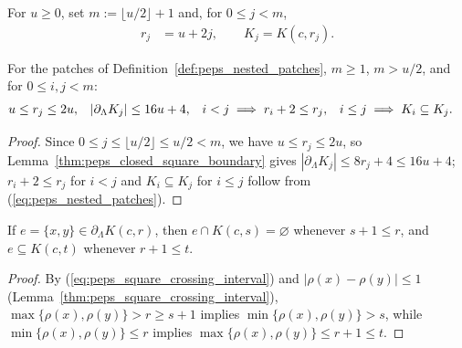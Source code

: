 \begin{definition}
    \label{def:peps_nested_patches}
    \leanok
    For $u\ge0$, set $m:=\lfloor u/2\rfloor+1$ and, for $0\le j<m$,
    \begin{align}
        r_j & =u+2j,\qquad K_j=K(c,r_j).
        \label{eq:peps_nested_patches}
    \end{align}
\end{definition}

\begin{lemma}
    \label{thm:peps_nested_patch_sizes}
    \leanok
    For the patches of Definition~\ref{def:peps_nested_patches}, $m\ge1$, $m>u/2$, and for $0\le i,j<m$:
    \begin{align}
        u \le r_j              & \le 2u,               &
        |\partial_\Lambda K_j| & \le 16u+4,            &
        i<j \implies r_i+2     & \le r_j,              &
        i\le j \implies K_i    & \subseteq K_j. \notag
    \end{align}
\end{lemma}
\begin{proof}\leanok
    Since $0\le j\le\lfloor u/2\rfloor\le u/2<m$, we have $u\le r_j\le 2u$, so Lemma~\ref{thm:peps_closed_square_boundary} gives $|\partial_\Lambda K_j|\le 8r_j+4\le 16u+4$; $r_i+2\le r_j$ for $i<j$ and $K_i\subseteq K_j$ for $i\le j$ follow from (\ref{eq:peps_nested_patches}).
\end{proof}

\begin{lemma}
    \label{thm:peps_square_crossing_support}
    \leanok
    If $e=\{x,y\}\in\partial_\Lambda K(c,r)$, then $e\cap K(c,s)=\varnothing$ whenever $s+1\le r$, and $e\subseteq K(c,t)$ whenever $r+1\le t$.
\end{lemma}
\begin{proof}\leanok
    By (\ref{eq:peps_square_crossing_interval}) and $|\rho(x)-\rho(y)|\le1$ (Lemma~\ref{thm:peps_square_crossing_interval}), $\max\{\rho(x),\rho(y)\}>r\ge s+1$ implies $\min\{\rho(x),\rho(y)\}>s$, while $\min\{\rho(x),\rho(y)\}\le r$ implies $\max\{\rho(x),\rho(y)\}\le r+1\le t$.
\end{proof}

